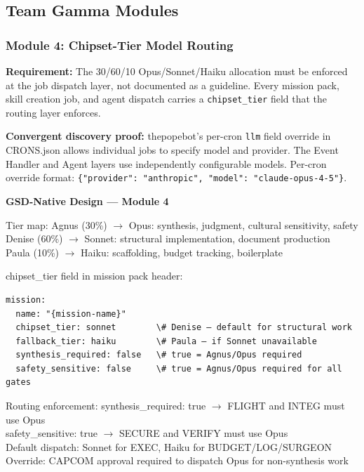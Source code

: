 \documentclass[11pt,letterpaper]{article}
\begin{document}
\subsection{Team Gamma Modules}

\subsubsection{Module 4: Chipset-Tier Model Routing}

\textbf{Requirement:} The 30/60/10 Opus/Sonnet/Haiku allocation must be enforced at the job dispatch layer, not documented as a guideline. Every mission pack, skill creation job, and agent dispatch carries a \texttt{chipset\_tier} field that the routing layer enforces.

\textbf{Convergent discovery proof:} thepopebot's per-cron \texttt{llm} field override in CRONS.json allows individual jobs to specify model and provider. The Event Handler and Agent layers use independently configurable models. Per-cron override format: \texttt{\{"provider": "anthropic", "model": "claude-opus-4-5"\}}.

\begin{implbox}
\textbf{GSD-Native Design --- Module 4}

Tier map:
  Agnus (30\%) $\rightarrow$ Opus: synthesis, judgment, cultural sensitivity, safety\\
  Denise (60\%) $\rightarrow$ Sonnet: structural implementation, document production\\
  Paula (10\%) $\rightarrow$ Haiku: scaffolding, budget tracking, boilerplate

chipset\_tier field in mission pack header:
\begin{verbatim}
mission:
  name: "{mission-name}"
  chipset_tier: sonnet        \# Denise — default for structural work
  fallback_tier: haiku        \# Paula — if Sonnet unavailable
  synthesis_required: false   \# true = Agnus/Opus required
  safety_sensitive: false     \# true = Agnus/Opus required for all gates
\end{verbatim}

Routing enforcement:
  synthesis\_required: true $\rightarrow$ FLIGHT and INTEG must use Opus\\
  safety\_sensitive: true $\rightarrow$ SECURE and VERIFY must use Opus\\
  Default dispatch: Sonnet for EXEC, Haiku for BUDGET/LOG/SURGEON\\
  Override: CAPCOM approval required to dispatch Opus for non-synthesis work
\end{implbox}
\end{document}
